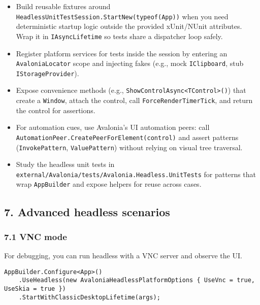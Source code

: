 \begin{itemize}
\tightlist
\item
  Build reusable fixtures around
  \passthrough{\lstinline!HeadlessUnitTestSession.StartNew(typeof(App))!}
  when you need deterministic startup logic outside the provided
  xUnit/NUnit attributes. Wrap it in
  \passthrough{\lstinline!IAsyncLifetime!} so tests share a dispatcher
  loop safely.
\item
  Register platform services for tests inside the session by entering an
  \passthrough{\lstinline!AvaloniaLocator!} scope and injecting fakes
  (e.g., mock \passthrough{\lstinline!IClipboard!}, stub
  \passthrough{\lstinline!IStorageProvider!}).
\item
  Expose convenience methods (e.g.,
  \passthrough{\lstinline!ShowControlAsync<TControl>()!}) that create a
  \passthrough{\lstinline!Window!}, attach the control, call
  \passthrough{\lstinline!ForceRenderTimerTick!}, and return the control
  for assertions.
\item
  For automation cues, use Avalonia's UI automation peers: call
  \passthrough{\lstinline!AutomationPeer.CreatePeerForElement(control)!}
  and assert patterns (\passthrough{\lstinline!InvokePattern!},
  \passthrough{\lstinline!ValuePattern!}) without relying on visual tree
  traversal.
\item
  Study the headless unit tests in
  \passthrough{\lstinline!external/Avalonia/tests/Avalonia.Headless.UnitTests!}
  for patterns that wrap \passthrough{\lstinline!AppBuilder!} and expose
  helpers for reuse across cases.
\end{itemize}

\subsection{7. Advanced headless
scenarios}\label{advanced-headless-scenarios}

\subsubsection{7.1 VNC mode}\label{vnc-mode}

For debugging, you can run headless with a VNC server and observe the
UI.

\begin{lstlisting}
AppBuilder.Configure<App>()
    .UseHeadless(new AvaloniaHeadlessPlatformOptions { UseVnc = true, UseSkia = true })
    .StartWithClassicDesktopLifetime(args);
\end{lstlisting}

